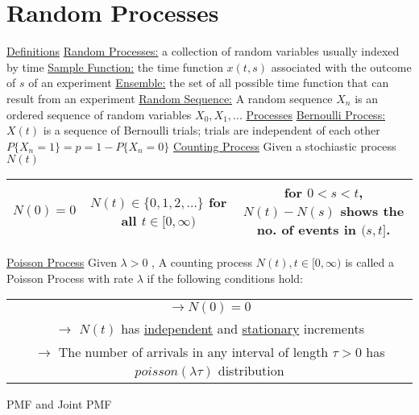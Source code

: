 \documentclass{article}
\begin{document}
	\section{Random Processes}
	\underline{Definitions}
	\newline
	\underline{Random Processes:} a collection of random variables usually indexed by time
	\newline
	\underline{Sample Function:} the time function  $x(t, s)$ associated with the outcome of $s$ of an experiment
	\newline
	\underline{Ensemble:} the set of all possible time function that can result from an experiment
	\newline
	\underline{Random Sequence:} A random sequence $X_n$ is an ordered sequence of random variables $X_0, X_1, ...$ 
	\newline
	\newline
	\underline{Processes}
	\newline
	\underline{Bernoulli Process:} $X(t)$ is a sequence of Bernoulli trials; trials are independent of each other
	\newline
	$P\{X_n = 1\} = p = 1 - P\{X_n = 0\}$
	\newline
	\underline{Counting Process} Given a stochiastic process $N(t)$
	\newline
	\begin{tabular}{|c|c|c|}
		\hline 
		$N(0) = 0$ &
		$N(t) \in \{0, 1, 2,...\}$ for all $t \in [0, \infty)$ &
		for $0 < s < t$, $N(t) - N(s)$ shows the no. of events in $(s,t]$.\\
		\hline
	\end{tabular}
	\newline
	\underline{Poisson Process} Given $\lambda > 0$ , A counting process $N(t), t \in [0, \infty)$ is called a Poisson Process with rate $\lambda$ if the following conditions hold:
	\newline
	\begin{tabular}{|c|}
		\hline $\to N(0) = 0$ \\ 
		$\to$ $N(t)$ has \underline{independent} and \underline{stationary} increments \\ 
		$\to$ The number of arrivals in any interval of length $\tau > 0$ has $poisson(\lambda\tau)$ distribution\\
		\hline
	\end{tabular}
	\newline
	PMF and Joint PMF
	\newline
\end{document}
